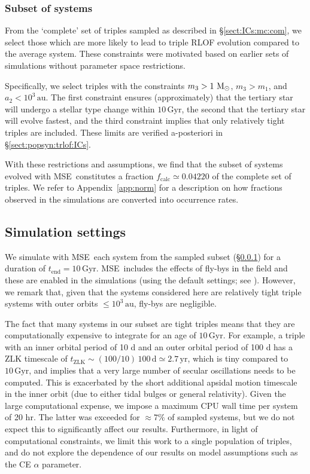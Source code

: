 \documentclass[twocolumn,appendixfloats,tighten]{aastex631}
\def\msun{{\rm\,M_\odot}}
\newcommand{\au}{\mathrm{au}}
\newcommand{\yr}{\mathrm{yr}}
\newcommand{\gyr}{\mathrm{Gyr}}
\newcommand{\mse}{\textsc{MSE}}
\begin{document}
\subsubsection{Subset of systems}
\label{sect:ICs:mc:sub}
From the `complete' set of triples sampled as described in \S\ref{sect:ICs:mc:com}, we select those which are more likely to lead to triple RLOF evolution compared to the average system. These constraints were motivated based on earlier sets of simulations without parameter space restrictions.

Specifically, we select triples with the constraints $m_3>1\,\msun$, $m_3>m_1$, and $a_2 < 10^3\,\au$. The first constraint ensures (approximately) that the tertiary star will undergo a stellar type change within $10\,\gyr$, the second that the tertiary star will evolve fastest, and the third constraint implies that only relatively tight triples are included. These limits are verified a-posteriori in \S\ref{sect:popsyn:trlof:ICs}.

With these restrictions and assumptions, we find that the subset of systems evolved with \mse~constitutes a fraction $f_\mathrm{calc} \simeq 0.04220$ of the complete set of triples. We refer to Appendix~\ref{app:norm} for a description on how fractions observed in the simulations are converted into occurrence rates. 

\subsection{Simulation settings}
\label{sect:ICs:mc:set}
We simulate with \mse~each system from the sampled subset (\S\ref{sect:ICs:mc:sub}) for a duration of $t_\mathrm{end}=10\,\gyr$. \mse~includes the effects of fly-bys in the field and these are enabled in the simulations (using the default settings; see \citealt{2021MNRAS.502.4479H}). However, we remark that, given that the systems considered here are relatively tight triple systems with outer orbits $\leq 10^3\,\au$, fly-bys are negligible. 

The fact that many systems in our subset are tight triples means that they are computationally expensive to integrate for an age of $10\,\gyr$. For example, a triple with an inner orbital period of 10 d and an outer orbital period of 100 d has a ZLK timescale \citep[e.g.,][]{2015MNRAS.452.3610A} of $t_\mathrm{ZLK} \sim (100/10) \,100\,\mathrm{d} \simeq 2.7 \,\yr$, which is tiny compared to $10 \, \gyr$, and implies that a very large number of secular oscillations needs to be computed. This is exacerbated by the short additional apsidal motion timescale in the inner orbit (due to either tidal bulges or general relativity). Given the large computational expense, we impose a maximum CPU wall time per system of 20 hr. The latter was exceeded for $\approx 7\%$ of sampled systems, but we do not expect this to significantly affect our results. Furthermore, in light of computational constraints, we limit this work to a single population of triples, and do not explore the dependence of our results on model assumptions such as the CE $\alpha$ parameter. 
\end{document}
